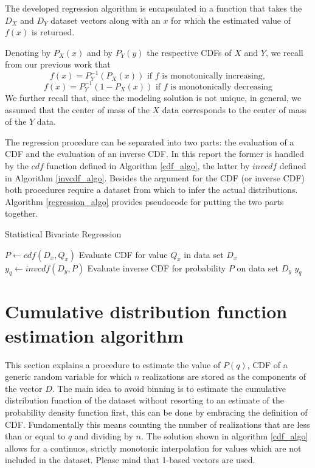\documentclass[10pt,final]{siamltex}
\begin{document}
The developed regression algorithm is encapsulated in a function that takes the $D_X$ and $D_Y$ dataset vectors along with an $x$ for which the estimated value of $f(x)$ is returned.

Denoting by $P_X(x)$ and by $P_Y(y)$ the respective CDFs of $X$ and $Y$, we recall from our previous work that
\begin{equation}
  f(x)=P_Y^{-1}(P_X(x)) \text{ if $f$ is monotonically increasing},
\end{equation}
\begin{equation}
  f(x)=P_Y^{-1}(1-P_X(x)) \text{ if $f$ is monotonically decreasing}
\end{equation}
We further recall that, since the modeling solution is not unique, in general, we assumed that the center of mass of the $X$ data corresponds to the center of mass of the $Y$ data.

The regression procedure can be separated into two parts: the evaluation of a CDF and the evaluation of an inverse CDF. In this report the former is handled by the $cdf$ function defined in Algorithm \ref{cdf_algo}, the latter by $invcdf$ defined in Algorithm \ref{invcdf_algo}. Besides the argument for the CDF (or inverse CDF) both procedures require a dataset from which to infer the actual distributions. Algorithm \ref{regression_algo} provides pseudocode for putting the two parts together.

\begin{algorithm}
  \caption{Statistical Bivariate Regression}
  \label{regression_algo}
  \begin{algorithmic}[1]
    \State $P \gets cdf(D_x, Q_x)$
    \Comment Evaluate CDF for value $Q_x$ in data set $D_x$
    \State $y_q \gets invcdf(D_y, P)$
    \Comment Evaluate inverse CDF for probability $P$ on data set $D_y$
    \State \Return $y_q$
    \EndFunction
  \end{algorithmic}
\end{algorithm}

\section{Cumulative distribution function estimation algorithm}
%
This section explains a procedure to estimate the value of $P(q)$, CDF of a generic random variable for which $n$ realizations are stored as the components of the vector $D$.
The main idea to avoid binning is to estimate the cumulative distribution function of the dataset without resorting to an estimate of the probability density function first, this can be done by embracing the definition of CDF. Fundamentally this means counting the number of realizations that are less than or equal to $q$ and dividing by $n$. The solution shown in algorithm \ref{cdf_algo} allows for a continuos, strictly monotonic interpolation for values which are not included in the dataset. Please mind that 1-based vectors are used.
\end{document}
